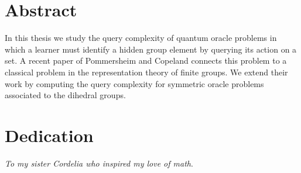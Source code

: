 	
	


	

    \tableofcontents

    \chapter*{Abstract}
    In this thesis we study the query complexity of quantum oracle problems in which a learner must identify a 
    hidden group element by querying its action on a set. A recent paper of Pommersheim and Copeland connects this 
    problem to a classical problem in the representation theory of finite groups. We extend their work by computing 
    the query complexity for symmetric oracle problems associated to the dihedral groups.
    
    \chapter*{Dedication}
    \emph{To my sister Cordelia who inspired my love of math}.
  \mainmatter %
  \pagestyle{fancyplain} %


